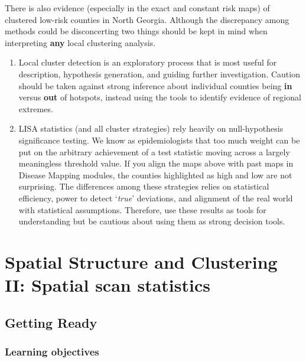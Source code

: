 \documentclass[
]{book}
\providecommand{\tightlist}{%
  \setlength{\itemsep}{0pt}\setlength{\parskip}{0pt}}
\begin{document}
There is also evidence (especially in the exact and constant risk maps) of clustered low-risk counties in North Georgia. Although the discrepancy among methods could be disconcerting two things should be kept in mind when interpreting \textbf{any} local clustering analysis.

\begin{enumerate}
\def\labelenumi{\arabic{enumi}.}
\tightlist
\item
  Local cluster detection is an exploratory process that is most useful for description, hypothesis generation, and guiding further investigation. Caution should be taken against strong inference about individual counties being \textbf{in} versus \textbf{out} of hotspots, instead using the tools to identify evidence of regional extremes.
\item
  LISA statistics (and all cluster strategies) rely heavily on null-hypothesis significance testing. We know as epidemiologists that too much weight can be put on the arbitrary achievement of a test statistic moving across a largely meaningless threshold value. If you align the maps above with past maps in Disease Mapping modules, the counties highlighted as high and low are not surprising. The differences among these strategies relies on statistical efficiency, power to detect `\emph{true}' deviations, and alignment of the real world with statistical assumptions. Therefore, use these results as tools for understanding but be cautious about using them as strong decision tools.
\end{enumerate}

\hypertarget{spatial-structure-and-clustering-ii-spatial-scan-statistics}{%
\chapter{Spatial Structure and Clustering II: Spatial scan statistics}\label{spatial-structure-and-clustering-ii-spatial-scan-statistics}}

\hypertarget{getting-ready-7}{%
\section{Getting Ready}\label{getting-ready-7}}

\hypertarget{learning-objectives-8}{%
\subsection{Learning objectives}\label{learning-objectives-8}}
\end{document}
